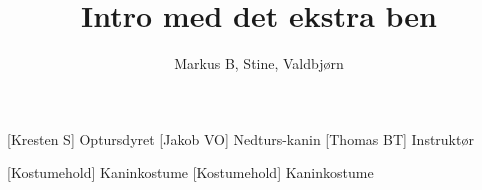 \documentclass[a4paper,12pt]{article}
\title{Intro med det ekstra ben}
\author{Markus B, Stine, Valdbjørn}
\begin{document}
\maketitle




\begin{roles}
	[Kresten S] Optursdyret
	[Jakob VO] Nedturs-kanin
	[Thomas BT] Instruktør
\end{roles}


\begin{props}
	[Kostumehold] Kaninkostume
	[Kostumehold] Kaninkostume
\end{props}
\end{document}
